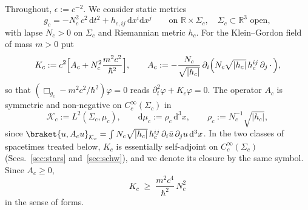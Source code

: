\documentclass[%
 aip,
 jmp,
 amsmath,amssymb,
 reprint, onecolumn
]{revtex4-1}
\theoremstyle{definition}
\theoremstyle{remark}
\newcommand{\R}{\mathbb{R}}
\newcommand{\K}{\mathcal{K}}
\newcommand{\rmd}{\mathrm{d}}
\begin{document}
Throughout, $\epsilon:=c^{-2}$. We consider static metrics
\begin{equation}\label{eq:static-metric}
g_c=-N_c^2\,c^2\,\rmd t^2+h_{c,ij}\,\rmd x^i\rmd x^j
\qquad\text{on }\R\times\Sigma_c,\quad \Sigma_c\subset\R^3\text{ open},
\end{equation}
with lapse $N_c>0$ on $\Sigma_c$ and Riemannian metric $h_c$. For the
Klein--Gordon field of mass $m>0$ put
\begin{equation}\label{eq:Kc}
K_c:=c^2\Bigl[A_c+N_c^2\frac{m^2c^2}{\hbar^2}\Bigr],\qquad
A_c:=-\frac{N_c}{\sqrt{|h_c|}}\,\partial_i\Bigl(N_c\sqrt{|h_c|}\,
h_c^{ij}\,\partial_j\,\cdot\,\Bigr),
\end{equation}
so that $(\Box_{g_c}-m^2c^2/\hbar^2)\varphi=0$ reads $\partial_t^2\varphi+
K_c\varphi=0$. The operator $A_c$ is symmetric and non-negative on
$C_c^\infty(\Sigma_c)$ in
\begin{equation}\label{eq:Kc-space}
\K_c:=L^2(\Sigma_c,\mu_c),\qquad \rmd\mu_c:=\rho_c\,\rmd^3x,\qquad
\rho_c:=N_c^{-1}\sqrt{|h_c|},
\end{equation}
since $\braket{u,A_cu}_{\K_c}=\int N_c\sqrt{|h_c|}\,h_c^{ij}\,
\partial_i\bar u\,\partial_ju\,\rmd^3x$. In the two classes of
spacetimes treated below, $K_c$ is essentially self-adjoint on
$C_c^\infty(\Sigma_c)$ (Secs.~\ref{sec:stars} and~\ref{sec:schw}), and we
denote its closure by the same symbol. Since $A_c\geq0$,
\begin{equation}\label{eq:K-lower}
K_c\;\geq\;\frac{m^2c^4}{\hbar^2}\,N_c^2
\end{equation}
in the sense of forms.
\end{document}
